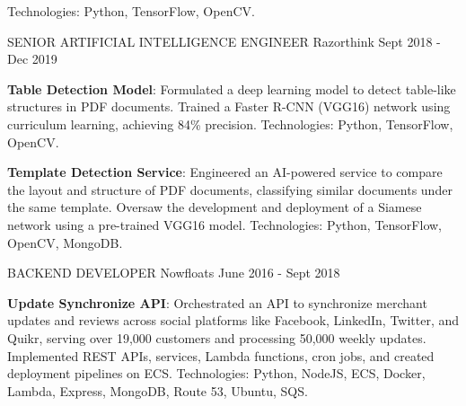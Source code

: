 \begin{cventries}
{\begin{cvitems}
{        Technologies: Python, TensorFlow, OpenCV.}
	\end{cvitems}
    }
\vspace{2em} %
  \cventry
    {SENIOR ARTIFICIAL INTELLIGENCE ENGINEER} %
    {Razorthink} %
    {} %
    {Sept 2018 - Dec 2019} %
    {
      \begin{cvitems} %
        \item{\textbf{Table Detection Model}: Formulated a deep learning model to 
        detect table-like structures in PDF documents. \newline Trained a Faster 
        R-CNN (VGG16) network using curriculum learning, 
        achieving 84\% precision. \newline Technologies: Python, TensorFlow, OpenCV.}      
        \item{\textbf{Template Detection Service}: Engineered an AI-powered service to compare the 
        layout and structure of PDF documents, classifying similar documents under 
        the same template. \newline Oversaw the development and deployment of a Siamese network using a pre-trained 
        VGG16 model. \newline Technologies: Python, TensorFlow, OpenCV, MongoDB.}       
	\end{cvitems}
    }
\vspace{2em} %
  \cventry
    {BACKEND DEVELOPER} %
    {Nowfloats} %
    {} %
    {June 2016 - Sept 2018} %
    {
      \begin{cvitems} %
        \item{\textbf{Update Synchronize API}: Orchestrated an API to synchronize merchant updates and reviews across social platforms like Facebook, LinkedIn, Twitter, and Quikr, serving over 19,000 customers and processing 50,000 weekly updates. \newline Implemented REST APIs, services, Lambda functions, cron jobs, and created deployment pipelines on ECS. \newline Technologies: Python, NodeJS, ECS, Docker, Lambda, Express, MongoDB, Route 53, Ubuntu, SQS.}

\end{cvitems}}
\end{cventries}
